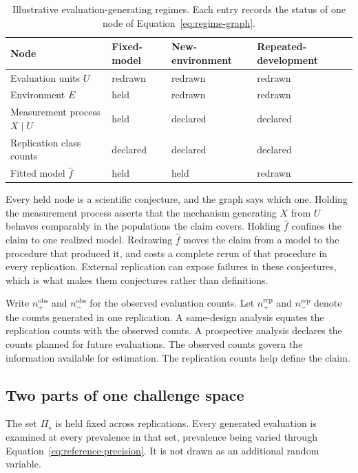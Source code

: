 \documentclass[11pt]{article}
\newcommand{\PSet}{\Pi_\star}
\theoremstyle{remark}
\begin{document}
\begin{table}[ht]
\centering
\caption{Illustrative evaluation-generating regimes. Each entry records the status of one node of Equation~\eqref{eq:regime-graph}.}
\label{tab:regimes}
\begin{tabularx}{\textwidth}{@{}>{\raggedright\arraybackslash}p{}XXX@{}}
\toprule
Node & Fixed-model & New-environment & Repeated-development \\
\midrule
Evaluation units $U$ & redrawn & redrawn & redrawn \\
Environment $E$ & held & redrawn & redrawn \\
Measurement process $X\mid U$ & held & declared & declared \\
Replication class counts & declared & declared & declared \\
Fitted model $\widehat f$ & held & held & redrawn \\
\bottomrule
\end{tabularx}
\end{table}

Every held node is a scientific conjecture, and the graph says which one. Holding the measurement process asserts that the mechanism generating $X$ from $U$ behaves comparably in the populations the claim covers. Holding $\widehat f$ confines the claim to one realized model. Redrawing $\widehat f$ moves the claim from a model to the procedure that produced it, and costs a complete rerun of that procedure in every replication. External replication can expose failures in these conjectures, which is what makes them conjectures rather than definitions.

Write $n_+^{\mathrm{obs}}$ and $n_-^{\mathrm{obs}}$ for the observed evaluation counts. Let $n_+^{\mathrm{rep}}$ and $n_-^{\mathrm{rep}}$ denote the counts generated in one replication. A same-design analysis equates the replication counts with the observed counts. A prospective analysis declares the counts planned for future evaluations. The observed counts govern the information available for estimation. The replication counts help define the claim.

\subsection{Two parts of one challenge space}
\label{sec:challenge-space}

The set $\PSet$ is held fixed across replications. Every generated evaluation is examined at every prevalence in that set, prevalence being varied through Equation~\eqref{eq:reference-precision}. It is not drawn as an additional random variable.
\end{document}
